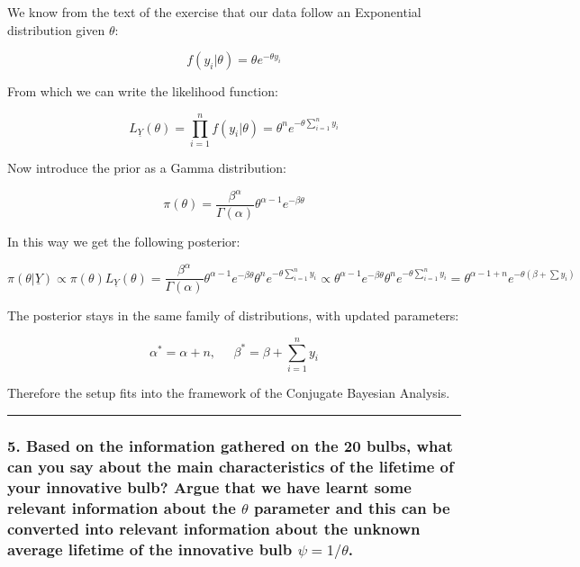 \documentclass[
]{article}
\begin{document}
We know from the text of the exercise that our data follow an
Exponential distribution given \(\theta\):

\[
f(y_i|\theta) = \theta e^{-\theta y_i}
\]

From which we can write the likelihood function:

\[
L_{\underline{Y}}(\theta) = \prod_{i=1}^{n}f(y_i|\theta) = \theta^n e^{-\theta \sum_{i=1}^{n} y_i}
\]

Now introduce the prior as a Gamma distribution:

\[
\pi(\theta) = \frac{\beta^{\alpha}}{\Gamma(\alpha)}\theta^{\alpha-1}e^{-\beta \theta}
\]

In this way we get the following posterior:

\[
\pi(\theta|\underline{Y}) \propto
\pi(\theta)L_{\underline{Y}}(\theta) =
\frac{\beta^{\alpha}}{\Gamma(\alpha)}\theta^{\alpha-1}e^{-\beta \theta} \theta^n e^{-\theta \sum_{i=1}^{n} y_i}
\propto \theta^{\alpha-1}e^{-\beta\theta}\theta^ne^{-\theta \sum_{i=1}^{n} y_i}=\theta^{\alpha - 1 + n}e^{-\theta(\beta + \sum y_i)}
\]

The posterior stays in the same family of distributions, with updated
parameters:

\[
\alpha^* = \alpha + n, \;\;\;\;\; \beta^* = \beta + \sum_{i=1}^{n} y_i
\]

Therefore the setup fits into the framework of the Conjugate Bayesian
Analysis.

\begin{center}\rule{0.5\linewidth}{0.5pt}\end{center}

\hypertarget{based-on-the-information-gathered-on-the-20-bulbs-what-can-you-say-about-the-main-characteristics-of-the-lifetime-of-your-innovative-bulb-argue-that-we-have-learnt-some-relevant-information-about-the-theta-parameter-and-this-can-be-converted-into-relevant-information-about-the-unknown-average-lifetime-of-the-innovative-bulb-psi1theta.}{%
\subsubsection{\texorpdfstring{5. Based on the information gathered on
the 20 bulbs, what can you say about the main characteristics of the
lifetime of your innovative bulb? Argue that we have learnt some
relevant information about the \(\theta\) parameter and this can be
converted into relevant information about the unknown average lifetime
of the innovative bulb
\(\psi=1/\theta\).}{5. Based on the information gathered on the 20 bulbs, what can you say about the main characteristics of the lifetime of your innovative bulb? Argue that we have learnt some relevant information about the \textbackslash theta parameter and this can be converted into relevant information about the unknown average lifetime of the innovative bulb \textbackslash psi=1/\textbackslash theta.}}\label{based-on-the-information-gathered-on-the-20-bulbs-what-can-you-say-about-the-main-characteristics-of-the-lifetime-of-your-innovative-bulb-argue-that-we-have-learnt-some-relevant-information-about-the-theta-parameter-and-this-can-be-converted-into-relevant-information-about-the-unknown-average-lifetime-of-the-innovative-bulb-psi1theta.}}
\end{document}
